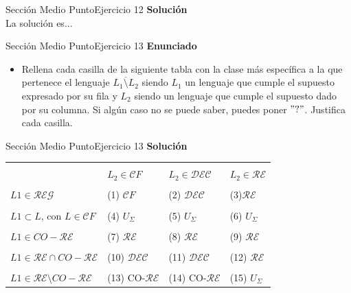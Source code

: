 \documentclass[10pt, envcountsect, presentation, aspectratio=169]{beamer}
\newcommand{\lreg}{\ensuremath{\mathcal {REG}}}
\newcommand{\lcf}{\ensuremath{\mathcal CF}}
\newcommand{\ld}{\ensuremath{\mathcal {DEC}}}
\newcommand{\lr}{\ensuremath{\mathcal {RE}}}
\begin{document}

\begin{frame}{Sección Medio Punto}{Ejercicio 12}
    \textbf{Solución}\\
    La solución es...
\end{frame}


\begin{frame}{Sección Medio Punto}{Ejercicio 13}
    \textbf{Enunciado}
    \begin{itemize}
        \item Rellena cada casilla de la siguiente tabla con la clase más específica a la que pertenece el lenguaje  $\overline{L_1 \setminus L_2}$ siendo $L_1$ un lenguaje que cumple el supuesto expresado por su fila y $L_2$ siendo un lenguaje que cumple el supuesto dado por su columna. Si algún caso no se puede saber, puedes poner   $"?"$. Justifica cada casilla.\\
    \end{itemize}
\end{frame}


\begin{frame}{Sección Medio Punto}{Ejercicio 13}
    \textbf{Solución}\\
    \begin{table}[h]
             \begin{tabular}{|l|l|l|l|}
             \hline
             &&&\\
             &$L_2 \in \lcf$ &$ L_2 \in \ld$ & $ L_2 \in \lr$\\
             \hline
             &&&\\
              $ L1 \in \lreg$&(1) \lcf &(2) \ld&(3)\lr\\
              \hline
             &&&\\
             $ L1 \subset L$, con $L \in \lcf$&(4) $U_\Sigma$&(5) $U_\Sigma$&(6) $U_\Sigma$\\
              \hline
             &&&\\
             $L1 \in CO-\lr $&(7) \lr&(8) \lr&(9) \lr\\
              \hline
             &&&\\
             $L1 \in \lr \cap CO-\lr$&(10) \ld&(11) \ld&(12) \lr\\
              \hline
             &&&\\
             $ L1 \in \lr \setminus CO-\lr$&(13) CO-\lr &(14) CO-\lr&(15) $U_\Sigma$\\
              \hline
             \end{tabular}
        \end{table}
\end{frame}
\end{document}
